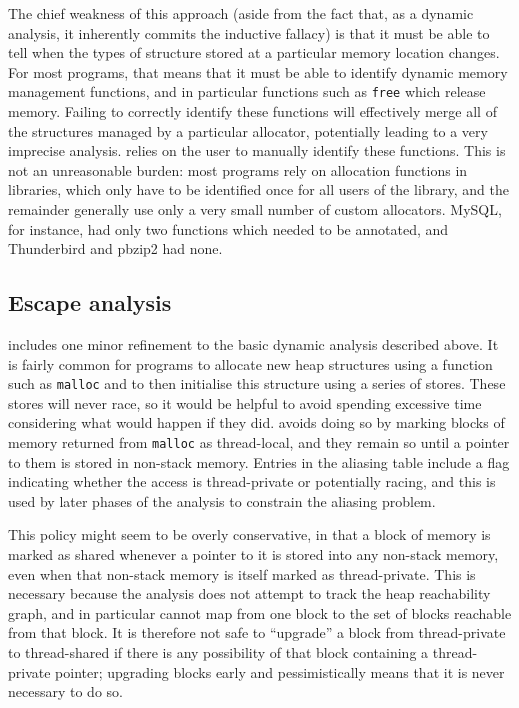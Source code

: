 The chief weakness of this approach (aside from the fact that, as a
dynamic analysis, it inherently commits the inductive fallacy) is that
it must be able to tell when the types of structure stored at a
particular memory location changes.  For most programs, that means
that it must be able to identify dynamic memory management functions,
and in particular functions such as \texttt{free} which release
memory.  Failing to correctly identify these functions will
effectively merge all of the structures managed by a particular
allocator, potentially leading to a very imprecise analysis.
{\Technique} relies on the user to manually identify these functions.
This is not an unreasonable burden: most programs rely on allocation
functions in libraries, which only have to be identified once for all
users of the library, and the remainder generally use only a very
small number of custom allocators.  MySQL, for instance, had only two
functions which needed to be annotated, and Thunderbird and pbzip2 had
none.

\subsection{Escape analysis}
{\Implementation} includes one minor refinement to the basic dynamic
analysis described above.  It is fairly common for programs to
allocate new heap structures using a function such as \texttt{malloc}
and to then initialise this structure using a series of stores.  These
stores will never race, so it would be helpful to avoid spending
excessive time considering what would happen if they did.
{\Technique} avoids doing so by marking blocks of memory returned from
\texttt{malloc} as thread-local, and they remain so until a pointer to
them is stored in non-stack memory.  Entries in the aliasing table
include a flag indicating whether the access is thread-private or
potentially racing, and this is used by later phases of the analysis
to constrain the aliasing problem.

This policy might seem to be overly conservative, in that a block of
memory is marked as shared whenever a pointer to it is stored into any
non-stack memory, even when that non-stack memory is itself marked as
thread-private.  This is necessary because the analysis does not
attempt to track the heap reachability graph, and in particular cannot
map from one block to the set of blocks reachable from that block.  It
is therefore not safe to ``upgrade'' a block from thread-private to
thread-shared if there is any possibility of that block containing a
thread-private pointer; upgrading blocks early and pessimistically
means that it is never necessary to do so.

